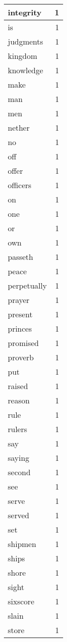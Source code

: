 \begin{center}
\begin{longtable}{l|r}
integrity & 1 \\ \hline
is & 1 \\ \hline
judgments & 1 \\ \hline
kingdom & 1 \\ \hline
knowledge & 1 \\ \hline
make & 1 \\ \hline
man & 1 \\ \hline
men & 1 \\ \hline
nether & 1 \\ \hline
no & 1 \\ \hline
off & 1 \\ \hline
offer & 1 \\ \hline
officers & 1 \\ \hline
on & 1 \\ \hline
one & 1 \\ \hline
or & 1 \\ \hline
own & 1 \\ \hline
passeth & 1 \\ \hline
peace & 1 \\ \hline
perpetually & 1 \\ \hline
prayer & 1 \\ \hline
present & 1 \\ \hline
princes & 1 \\ \hline
promised & 1 \\ \hline
proverb & 1 \\ \hline
put & 1 \\ \hline
raised & 1 \\ \hline
reason & 1 \\ \hline
rule & 1 \\ \hline
rulers & 1 \\ \hline
say & 1 \\ \hline
saying & 1 \\ \hline
second & 1 \\ \hline
see & 1 \\ \hline
serve & 1 \\ \hline
served & 1 \\ \hline
set & 1 \\ \hline
shipmen & 1 \\ \hline
ships & 1 \\ \hline
shore & 1 \\ \hline
sight & 1 \\ \hline
sixscore & 1 \\ \hline
slain & 1 \\ \hline
store & 1 \\ \hline

\end{longtable}
\end{center}
